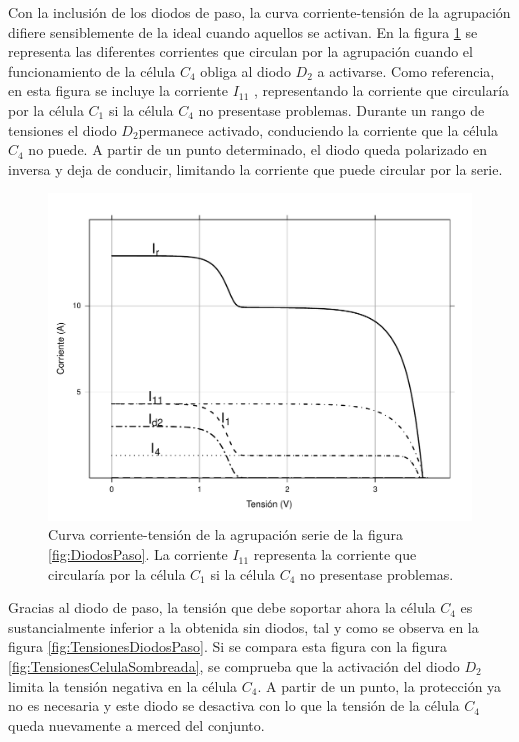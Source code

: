 Con la inclusión de los diodos de paso, la curva corriente-tensión
de la agrupación difiere sensiblemente de la ideal cuando aquellos
se activan. En la figura \ref{fig:CurvaIVDiodosPaso} se representa
las diferentes corrientes que circulan por la agrupación cuando el
funcionamiento de la célula $C_{4}$ obliga al diodo $D_{2}$ a activarse.
Como referencia, en esta figura se incluye la corriente $I_{11}$
, representando la corriente que circularía por la célula $C_{1}$
si la célula $C_{4}$ no presentase problemas. Durante un rango de
tensiones el diodo $D_{2}$permanece activado, conduciendo la corriente
que la célula $C_{4}$ no puede. A partir de un punto determinado,
el diodo queda polarizado en inversa y deja de conducir, limitando
la corriente que puede circular por la serie.


\begin{figure}
\begin{centering}
\includegraphics[scale=0.5]{../figs/CurvaIV_DiodoPaso}
\end{centering}

\caption{Curva corriente-tensión de la agrupación serie de la figura \ref{fig:DiodosPaso}.
La corriente $I_{11}$ representa la corriente que circularía por
la célula $C_{1}$ si la célula $C_{4}$ no presentase problemas.\label{fig:CurvaIVDiodosPaso}}

\end{figure}

Gracias al diodo de paso, la tensión que debe soportar ahora la célula
$C_{4}$ es sustancialmente inferior a la obtenida sin diodos, tal
y como se observa en la figura \ref{fig:TensionesDiodosPaso}. Si
se compara esta figura con la figura \ref{fig:TensionesCelulaSombreada},
se comprueba que la activación del diodo $D_{2}$ limita la tensión
negativa en la célula $C_{4}$. A partir de un punto, la protección
ya no es necesaria y este diodo se desactiva con lo que la tensión
de la célula $C_{4}$ queda nuevamente a merced del conjunto. 


